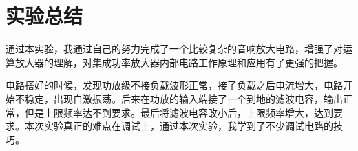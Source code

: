 \documentclass[a4paper]{article}
\theoremstyle{definition}
\theoremstyle{plain}
\theoremstyle{remark}
\begin{document}
\section{实验总结}
通过本实验，我通过自己的努力完成了一个比较复杂的音响放大电路，增强了对运算放大器的理解，对集成功率放大器内部电路工作原理和应用有了更强的把握。

电路搭好的时候，发现功放级不接负载波形正常，接了负载之后电流增大，电路开始不稳定，出现自激振荡。后来在功放的输入端接了一个到地的滤波电容，输出正常，但是上限频率达不到要求。最后将滤波电容改小后，上限频率增大，达到要求。本次实验真正的难点在调试上，通过本次实验，我学到了不少调试电路的技巧。
\end{document}
